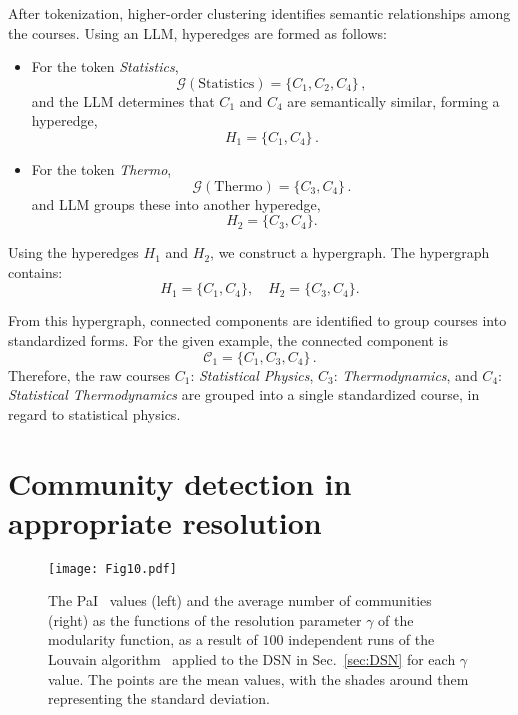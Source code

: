 \documentclass{bmcart}
\begin{document}
\begin{appendices}
After tokenization, higher-order clustering identifies semantic relationships among the courses. Using an LLM, hyperedges are formed as follows:
\begin{itemize}
\item For the token \textit{Statistics},
\[
\mathcal{G}(\text{Statistics}) = \{C_1, C_2, C_4\} \,,
\]
and the LLM determines that \( C_1 \) and \( C_4 \) are semantically similar, forming a hyperedge,
\[
H_1 = \{C_1, C_4\} \,.
\]

\item For the token \textit{Thermo},
\[
\mathcal{G}(\text{Thermo}) = \{C_3, C_4\} \,.
\]
and LLM groups these into another hyperedge,
\[
H_2 = \{C_3, C_4\}.
\]

\end{itemize}

Using the hyperedges \( H_1 \) and \( H_2 \), we construct a hypergraph. The hypergraph contains:
\[
H_1 = \{C_1, C_4\}, \quad H_2 = \{C_3, C_4\}.
\]

From this hypergraph, connected components are identified to group courses into standardized forms. 
For the given example, the connected component 
is
\[
\mathcal{C}_1 = \{C_1, C_3, C_4\} \,.
\]
Therefore, the raw courses $C_1$: \textit{Statistical Physics}, $C_3$: \textit{Thermodynamics}, and $C_4$: \textit{Statistical Thermodynamics} are grouped into a single standardized course, in regard to statistical physics.

\section{Community detection in appropriate resolution}
\label{sec:PaI}

\begin{figure}
\centering
\texttt{[image: Fig10.pdf]} 
\caption{The PaI~\cite{PhysRevE.103.052306} values (left) and the average number of communities (right) as the functions of the resolution parameter $\gamma$ of the modularity function, as a result of $100$ independent runs of the Louvain algorithm~\cite{Blondel2008} applied to the DSN in Sec.~\ref{sec:DSN} for each $\gamma$ value. The points are the mean values, with the shades around them representing the standard deviation.}
\label{figure: PaI}
\end{figure}


\end{appendices}
\end{document}
